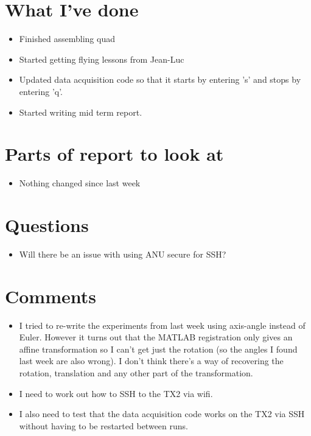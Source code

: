 \documentclass[12pt,a4paper]{article}
\begin{document}
\author{Katrina Ashton}


\pagestyle{fancy}
\fancyhf{}
\rhead{\thepage}

\section{What I've done}
\begin{itemize}
\item{Finished assembling quad}
\item{Started getting flying lessons from Jean-Luc}
\item{Updated data acquisition code so that it starts by entering 's' and stops by entering 'q'.}
\item{Started writing mid term report.}
\end{itemize}

\section{Parts of report to look at}
\begin{itemize}
\item{Nothing changed since last week}
\end{itemize}

\section{Questions}
\begin{itemize}
\item{Will there be an issue with using ANU secure for SSH?}
\end{itemize}

\section{Comments}
\begin{itemize}
\item{I tried to re-write the experiments from last week using axis-angle instead of Euler. However it turns out that the MATLAB registration only gives an affine transformation so I can't get just the rotation (so the angles I found last week are also wrong). I don't think there's a way of recovering the rotation, translation and any other part of the transformation.}
\item{I need to work out how to SSH to the TX2 via wifi.}
\item{I also need to test that the data acquisition code works on the TX2 via SSH without having to be restarted between runs.}
\end{itemize}
\end{document}
